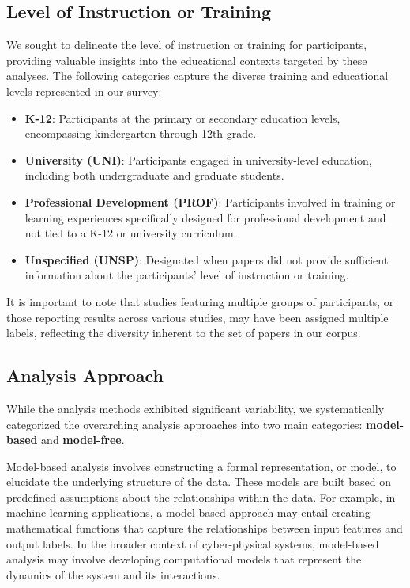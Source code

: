 \documentclass[manuscript,screen,review]{acmart}
\begin{document}
\subsection{Level of Instruction or Training} \label{subsec:level_of_instruction}
We sought to delineate the level of instruction or training for participants, providing valuable insights into the educational contexts targeted by these analyses. The following categories capture the diverse training and educational levels represented in our survey:

\begin{itemize}
    \item \textbf{K-12}: Participants at the primary or secondary education levels, encompassing kindergarten through 12th grade.
    \item \textbf{University (UNI)}: Participants engaged in university-level education, including both undergraduate and graduate students.
    \item \textbf{Professional Development (PROF)}: Participants involved in training or learning experiences specifically designed for professional development and not tied to a K-12 or university curriculum.
    \item \textbf{Unspecified (UNSP)}: Designated when papers did not provide sufficient information about the participants' level of instruction or training.
\end{itemize}

It is important to note that studies featuring multiple groups of participants, or those reporting results across various studies, may have been assigned multiple labels, reflecting the diversity inherent to the set of papers in our corpus.

\subsection{Analysis Approach} \label{subsec:analysis_approach}

While the analysis methods exhibited significant variability, we systematically categorized the overarching analysis approaches into two main categories: \textbf{model-based} and \textbf{model-free}.

Model-based analysis involves constructing a formal representation, or model, to elucidate the underlying structure of the data. These models are built based on predefined assumptions about the relationships within the data. For example, in machine learning applications, a model-based approach may entail creating mathematical functions that capture the relationships between input features and output labels. In the broader context of cyber-physical systems, model-based analysis may involve developing computational models that represent the dynamics of the system and its interactions.
\end{document}
